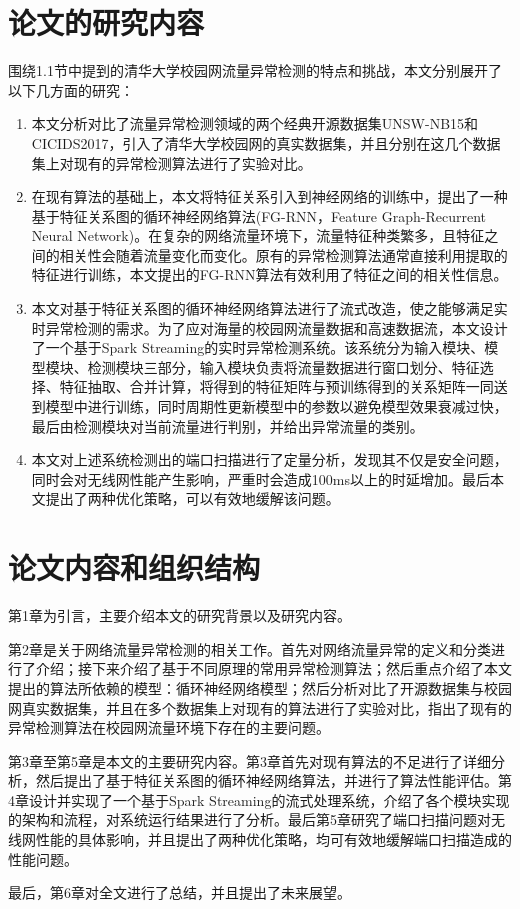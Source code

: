 \section{论文的研究内容}
围绕1.1节中提到的清华大学校园网流量异常检测的特点和挑战，本文分别展开了以下几方面的研究：
\begin{enumerate}
  \item 本文分析对比了流量异常检测领域的两个经典开源数据集UNSW-NB15和CICIDS2017，引入了清华大学校园网的真实数据集，并且分别在这几个数据集上对现有的异常检测算法进行了实验对比。
  \item 在现有算法的基础上，本文将特征关系引入到神经网络的训练中，提出了一种基于特征关系图的循环神经网络算法(FG-RNN，Feature Graph-Recurrent Neural Network)。在复杂的网络流量环境下，流量特征种类繁多，且特征之间的相关性会随着流量变化而变化。原有的异常检测算法通常直接利用提取的特征进行训练，本文提出的FG-RNN算法有效利用了特征之间的相关性信息。
  \item 本文对基于特征关系图的循环神经网络算法进行了流式改造，使之能够满足实时异常检测的需求。为了应对海量的校园网流量数据和高速数据流，本文设计了一个基于Spark Streaming的实时异常检测系统。该系统分为输入模块、模型模块、检测模块三部分，输入模块负责将流量数据进行窗口划分、特征选择、特征抽取、合并计算，将得到的特征矩阵与预训练得到的关系矩阵一同送到模型中进行训练，同时周期性更新模型中的参数以避免模型效果衰减过快，最后由检测模块对当前流量进行判别，并给出异常流量的类别。
  \item 本文对上述系统检测出的端口扫描进行了定量分析，发现其不仅是安全问题，同时会对无线网性能产生影响，严重时会造成100ms以上的时延增加。最后本文提出了两种优化策略，可以有效地缓解该问题。

\end{enumerate}

\section{论文内容和组织结构}
第1章为引言，主要介绍本文的研究背景以及研究内容。

第2章是关于网络流量异常检测的相关工作。首先对网络流量异常的定义和分类进行了介绍；接下来介绍了基于不同原理的常用异常检测算法；然后重点介绍了本文提出的算法所依赖的模型：循环神经网络模型；然后分析对比了开源数据集与校园网真实数据集，并且在多个数据集上对现有的算法进行了实验对比，指出了现有的异常检测算法在校园网流量环境下存在的主要问题。

第3章至第5章是本文的主要研究内容。第3章首先对现有算法的不足进行了详细分析，然后提出了基于特征关系图的循环神经网络算法，并进行了算法性能评估。第4章设计并实现了一个基于Spark Streaming的流式处理系统，介绍了各个模块实现的架构和流程，对系统运行结果进行了分析。最后第5章研究了端口扫描问题对无线网性能的具体影响，并且提出了两种优化策略，均可有效地缓解端口扫描造成的性能问题。

最后，第6章对全文进行了总结，并且提出了未来展望。
